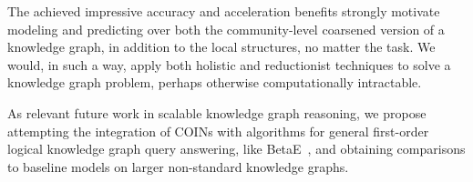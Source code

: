 The achieved impressive accuracy and acceleration benefits strongly motivate modeling and predicting over both the community-level coarsened version of a knowledge graph, in addition to the local structures, no matter the task. We would, in such a way, apply both holistic and reductionist techniques to solve a knowledge graph problem, perhaps otherwise computationally intractable.

As relevant future work in scalable knowledge graph reasoning, we propose attempting the integration of COINs with algorithms for general first-order logical knowledge graph query answering, like BetaE~\cite{ren_beta_2020}, and obtaining comparisons to baseline models on larger non-standard knowledge graphs.